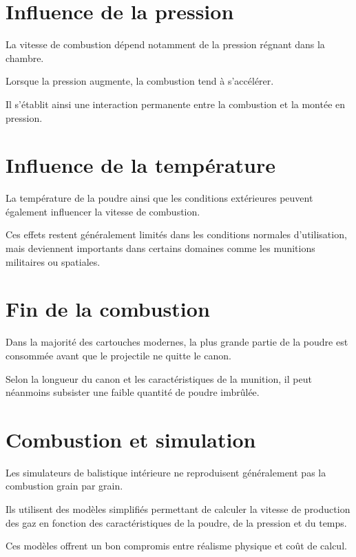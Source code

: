 \section{Influence de la pression}

La vitesse de combustion dépend notamment de la pression régnant dans la
chambre.

Lorsque la pression augmente, la combustion tend à s'accélérer.

Il s'établit ainsi une interaction permanente entre la combustion et la montée
en pression.

\section{Influence de la température}

La température de la poudre ainsi que les conditions extérieures peuvent
également influencer la vitesse de combustion.

Ces effets restent généralement limités dans les conditions normales
d'utilisation, mais deviennent importants dans certains domaines comme les
munitions militaires ou spatiales.

\section{Fin de la combustion}

Dans la majorité des cartouches modernes, la plus grande partie de la poudre est
consommée avant que le projectile ne quitte le canon.

Selon la longueur du canon et les caractéristiques de la munition, il peut
néanmoins subsister une faible quantité de poudre imbrûlée.

\section{Combustion et simulation}

\begin{simulation}

Les simulateurs de balistique intérieure ne reproduisent généralement pas la
combustion grain par grain.

Ils utilisent des modèles simplifiés permettant de calculer la vitesse de
production des gaz en fonction des caractéristiques de la poudre, de la pression
et du temps.

Ces modèles offrent un bon compromis entre réalisme physique et coût de calcul.

\end{simulation}


